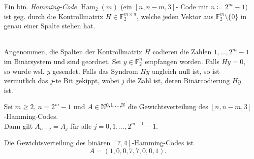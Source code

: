 \documentclass{cheat-sheet}
\newcommand{\F}{\mathbb{F}} %
\DeclareMathOperator{\Ham}{Ham} %
\begin{document}

\begin{konstr}
  Ein bin. \emph{Hamming-Code} $\Ham_2(m)$ (ein $[n, n {-} m, 3]$- Code mit $n \coloneqq 2^m - 1$) ist geg. durch die Kontrollmatrix $H \in \F_2^{m \times n}$, welche jeden Vektor aus $\F_2^m \setminus \{ 0 \}$ in genau einer Spalte stehen hat.
\end{konstr}

\begin{alg}\mbox{}\\
  Angenommen, die Spalten der Kontrollmatrix $H$ codieren die Zahlen $1, \ldots, 2^m - 1$ im Binärsystem und sind geordnet.
  Sei $y \in \F_2^n$ empfangen worden.
  Falls $Hy = 0$, so wurde wsl. $y$ gesendet.
  Falls das Syndrom $Hy$ ungleich null ist, so ist vermutlich das $j$-te Bit gekippt, wobei $j$ die Zahl ist, deren Binärcodierung $Hy$ ist.
\end{alg}


\begin{prop}
  Sei $m \geq 2$, $n = 2^m - 1$ und $A \in \mathbb{N}^{0, 1, \ldots, \mathbb{N}}$ die Gewichtsverteilung des $[n, n - m, 3]$-Hamming-Codes. \\
  Dann gilt $A_{n-j} = A_j$ für alle $j = 0, 1, \ldots, 2^{m-1} - 1$.
\end{prop}

\begin{satz}
  Die Gewichtsverteilung des binären $[7,4]$-Hamming-Codes ist
  \[ A = (1, 0, 0, 7, 7, 0, 0, 1). \]
\end{satz}
\end{document}
